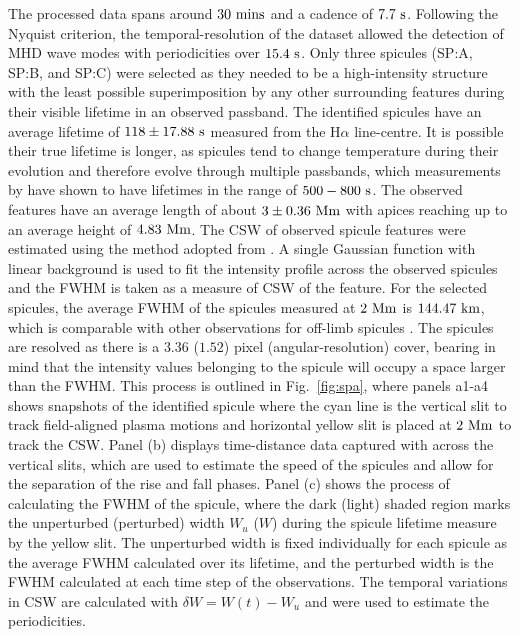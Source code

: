 %
The processed data spans around $30~\rm{mins}$ and a cadence of $7.7~\rm{s}$. Following the Nyquist criterion, the temporal-resolution of the dataset allowed the detection of MHD wave modes with periodicities over $15.4~\rm{s}$. Only three spicules (SP:A, SP:B, and SP:C) were selected as they needed to be a high-intensity structure with the least possible superimposition by any other surrounding features during their visible lifetime in an observed passband. The identified spicules have an average lifetime of $118\pm 17.88~\rm{s}$ measured from the H$\alpha$ line-centre. It is possible their true lifetime is longer, as spicules tend to change temperature during their evolution and therefore evolve through multiple passbands, which measurements by \cite{Pereira2014ApJ} have shown to have lifetimes in the range of $500-800~\rm{s}$. The observed features have an average length of about $3\pm0.36~\rm{Mm}$ with apices reaching up to an average height of $4.83~\rm{Mm}$. \np
%
The CSW of observed spicule features were estimated using the method adopted from \cite{Sharma2018ApJ85361S}. A single Gaussian function with linear background is used to fit the intensity profile across the observed spicules and the FWHM is taken as a measure of CSW of the feature. For the selected spicules, the average FWHM of the spicules measured at $2~\rm{Mm}$ is $144.47~\rm{km}$, which is comparable with other observations for off-limb spicules \citep{Sharma2018ApJ85361S}. The spicules are resolved as there is a $3.36$ ($1.52$) pixel (angular-resolution) cover, bearing in mind that the intensity values belonging to the spicule will occupy a space larger than the FWHM. This process is outlined in Fig.~\ref{fig:spa}, where panels a1-a4 shows snapshots of the identified spicule where the cyan line is the vertical slit to track field-aligned plasma motions and horizontal yellow slit is placed at $2~\rm{Mm}$ to track the CSW. Panel (b) displays time-distance data captured with across the vertical slits, which are used to estimate the speed of the spicules and allow for the separation of the rise and fall phases. Panel (c) shows the process of calculating the FWHM of the spicule, where the dark (light) shaded region marks the unperturbed (perturbed) width $W_u$ ($W$) during the spicule lifetime measure by the yellow slit. The unperturbed width is fixed individually for each spicule as the average FWHM calculated over its lifetime, and the perturbed width is the FWHM calculated at each time step of the observations. The temporal variations in CSW are calculated with $\delta W = W(t) - W_{u}$ and were used to estimate the periodicities. \np

